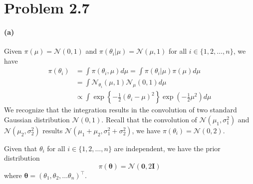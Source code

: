 \section{Problem 2.7}
\paragraph{(a)}
Given $\pi(\mu) = \mathcal{N}(0, 1)$ and $\pi(\theta_i \vert \mu) = \mathcal{N}(\mu, 1)$ for all $i\in\{1, 2, \dots, n\}$, we have
\begin{align*}
    \pi(\theta_i) &= \int \pi(\theta_i, \mu) d\mu = \int \pi(\theta_i \vert \mu) \pi(\mu) d\mu \\
    &= \int \mathcal{N}_{\theta_i} (\mu, 1) \mathcal{N}_{\mu}(0, 1) d\mu \\
    &\propto \int \exp \left\{ -\frac{1}{2}(\theta_i - \mu)^2 \right\} \exp(-\frac{1}{2} \mu^2)d\mu
\end{align*}
We recognize that the integration results in the convolution of two standard Gaussian distribution $\mathcal{N}(0, 1)$. Recall that the convolution of $\mathcal{N}(\mu_1, \sigma_1^2)$ and $\mathcal{N}(\mu_2, \sigma_2^2)$ results $\mathcal{N}(\mu_1+\mu_2, \sigma_1^2 + \sigma^2_2)$, we have $\pi(\theta_i) = \mathcal{N}(0, 2)$. 

Given that $\theta_i$ for all $i\in \{1, 2, \dots, n\}$ are independent, we have the prior distribution
\begin{equation*}
    \pi(\bm{\theta}) = \mathcal{N}(\bm{0}, 2\bm{I})
\end{equation*}
where $\bm{\theta} = (\theta_1, \theta_2, \dots \theta_n)^\top$.


